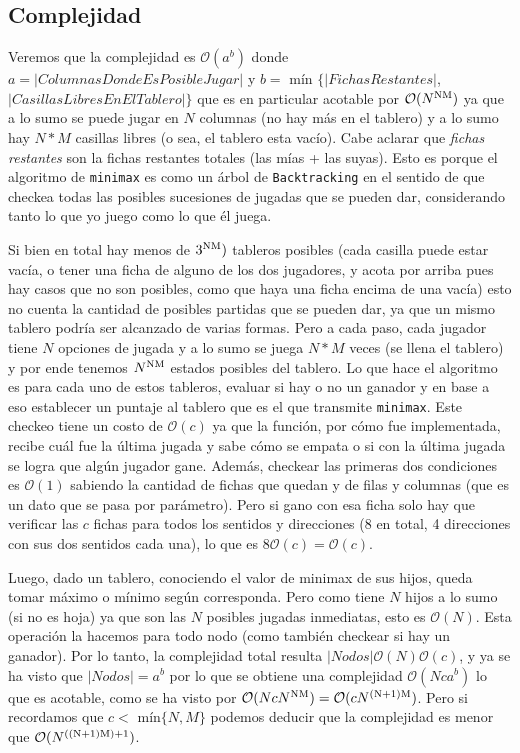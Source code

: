 \documentclass[A4paper,oneside,fleqn,11pt]{article}
\theoremstyle{definition}
\begin{document}
\subsection{Complejidad}

Veremos que la complejidad es $\mathcal{O}(a^b)$ donde $a=|Columnas Donde Es Posible Jugar|$ y $b =$ mín $\{|FichasRestantes|$, $|Casillas Libres En El Tablero|\}$ que es en particular acotable por $\mathcal{O}(N\textsuperscript{NM})$ ya que a lo sumo se puede jugar en $N$ columnas (no hay más en el tablero) y a lo sumo hay $N*M$ casillas libres (o sea, el tablero esta vacío). Cabe aclarar que \textit{fichas restantes} son la fichas restantes totales (las mías + las suyas). Esto es porque el algoritmo de \texttt{minimax} es como un árbol de \texttt{Backtracking} en el sentido de que checkea todas las posibles sucesiones de jugadas que se pueden dar, considerando tanto lo que yo juego como lo que él juega.

Si bien en total hay menos de $3\textsuperscript{NM})$ tableros posibles (cada casilla puede estar vacía, o tener una ficha de alguno de los dos jugadores, y acota por arriba pues hay casos que no son posibles, como que haya una ficha encima de una vacía) esto no cuenta la cantidad de posibles partidas que se pueden dar, ya que un mismo tablero podría ser alcanzado de varias formas. Pero a cada paso, cada jugador tiene $N$ opciones de jugada y a lo sumo se juega $N*M$ veces (se llena el tablero) y por ende tenemos $N\textsuperscript{NM}$ estados posibles del tablero. Lo que hace el algoritmo es para cada uno de estos tableros, evaluar si hay o no un ganador y en base a eso establecer un puntaje al tablero que es el que transmite \texttt{minimax}. Este checkeo tiene un costo de $\mathcal{O}(c)$ ya que la función, por cómo fue implementada, recibe cuál fue la última jugada y sabe cómo se empata o si con la última jugada se logra que algún jugador gane. Además, checkear las primeras dos condiciones es $\mathcal{O}(1)$ sabiendo la cantidad de fichas que quedan y de filas y columnas (que es un dato que se pasa por parámetro). Pero si gano con esa ficha solo hay que verificar las $c$ fichas para todos los sentidos y direcciones (8 en total, 4 direcciones con sus dos sentidos cada una), lo que es $8 \mathcal{O}(c)= \mathcal{O}(c)$. 

Luego, dado un tablero, conociendo el valor de minimax de sus hijos, queda tomar máximo o mínimo según corresponda. Pero como tiene $N$ hijos a lo sumo (si no es hoja) ya que son las $N$ posibles jugadas inmediatas, esto es $\mathcal{O}(N)$. Esta operación la hacemos para todo nodo (como también checkear si hay un ganador). Por lo tanto, la complejidad total resulta $|Nodos|\mathcal{O}(N)\mathcal{O}(c)$, y ya se ha visto que $|Nodos|=a^b$ por lo que se obtiene una complejidad $\mathcal{O}(N c a^b)$ lo que es acotable, como se ha visto por $\mathcal{O}(N c N\textsuperscript{NM})=\mathcal{O}(c N\textsuperscript{(N+1)M})$. Pero si recordamos que $c<$ mín$\{N,M\}$ podemos deducir que la complejidad es menor que $\mathcal{O}(N\textsuperscript{((N+1)M)+1})$.
\end{document}
